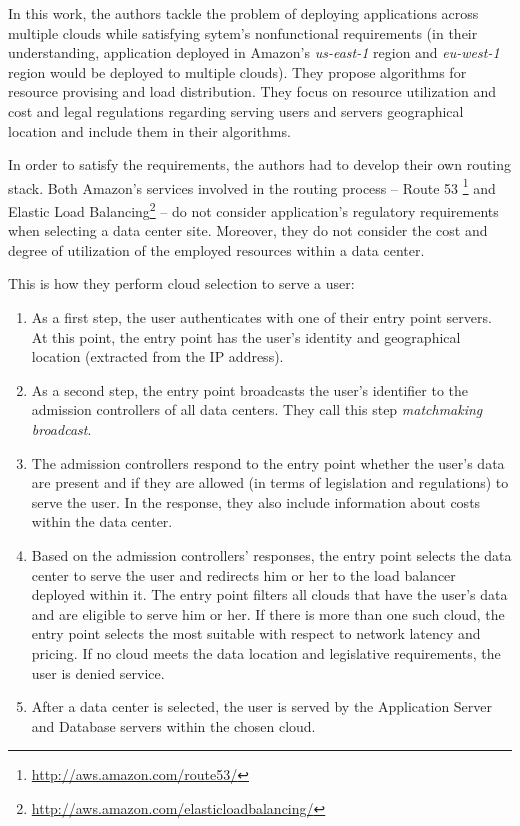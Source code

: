 \documentclass{uvamscse}
\begin{document}
In this work, the authors tackle the problem of deploying applications across multiple clouds while satisfying sytem's nonfunctional requirements (in their understanding, application deployed in Amazon's \textit{us-east-1} region and \textit{eu-west-1} region would be deployed to multiple clouds). They propose algorithms for resource provising and load distribution. They focus on resource utilization and cost and legal regulations regarding serving users and servers geographical location and include them in their algorithms.

In order to satisfy the requirements, the authors had to develop their own routing stack. Both Amazon's services involved in the routing process -- Route 53 \footnote{\url{http://aws.amazon.com/route53/}} and Elastic Load Balancing\footnote{\url{http://aws.amazon.com/elasticloadbalancing/}} -- do not consider application's regulatory requirements when selecting a data center site. Moreover, they do not consider the cost and degree of utilization of the employed resources within a data center.

This is how they perform cloud selection to serve a user:
\begin{enumerate}
  \item As a first step, the user authenticates with one of their entry point servers. At this point, the entry point has the user’s identity and geographical location (extracted from the IP address).
  \item As a second step, the entry point broadcasts the user’s identifier to the admission controllers of all data centers. They call this step \textit{matchmaking broadcast}.
  \item The admission controllers respond to the entry point whether the user’s data are present and if they are allowed (in terms of legislation and regulations) to serve the user. In the response, they also include information about costs within the data center.
  \item Based on the admission controllers’ responses, the entry point selects the data center to serve the user and redirects him or her to the load balancer deployed within it. The entry point filters all clouds that have the user’s data and are eligible to serve him or her. If there is more than one such cloud, the entry point selects the most suitable with respect to network latency and pricing. If no cloud meets the data location and legislative requirements, the user is denied service.
  \item After a data center is selected, the user is served by the Application Server and Database servers within the chosen cloud.
\end{enumerate}
\end{document}
